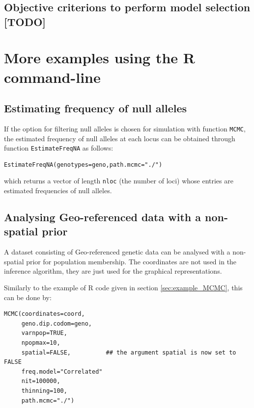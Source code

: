 \documentclass{article}
\begin{document}
\subsection{Objective criterions to perform model selection [TODO] }



\clearpage
\section[Command line examples]{More examples using the R command-line}\label{sec:more_example}


\subsection[Null alleles]{Estimating frequency of null alleles}

If the option for filtering null alleles is chosen for simulation with function \texttt{MCMC}, the estimated frequency of null alleles at each locus 
can be obtained through function \texttt{EstimateFreqNA} as follows:

\begin{verbatim}
EstimateFreqNA(genotypes=geno,path.mcmc="./")
\end{verbatim}



which returns  a vector of length \texttt{nloc} (the number of loci) whose entries
  are estimated frequencies of null alleles.



\subsection[Non-spatial prior]{Analysing Geo-referenced data with a non-spatial prior}

A dataset consisting of Geo-referenced genetic data can be analysed with a non-spatial prior for population membership. 
The coordinates are not used in the inference algorithm, they are just used for the graphical representations. 

Similarly to the example of R code given in section \ref{sec:example_MCMC}, this can be done by:

\begin{verbatim}
MCMC(coordinates=coord,
     geno.dip.codom=geno,
     varnpop=TRUE, 
     npopmax=10,
     spatial=FALSE,          ## the argument spatial is now set to FALSE
     freq.model="Correlated"
     nit=100000,
     thinning=100,
     path.mcmc="./")
\end{verbatim}
\end{document}

